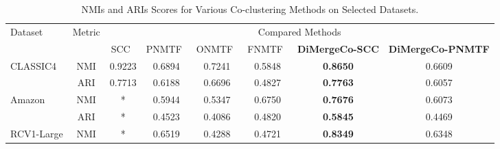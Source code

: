 \documentclass[journal]{IEEEtran}
\renewcommand{\cite}[1]{~\autocite{#1}}
\begin{document}
\begin{table}[htbp]
    \centering
    \caption{NMIs and ARIs Scores for Various Co-clustering Methods on Selected Datasets.}
    \label{tab:evaluation-metrics}
    \begin{tabular}{@{} l c cccccc @{}}
        \toprule
        \multirow{2}{*}{Dataset}    & \multirow{2}{*}{Metric} & \multicolumn{6}{c}{Compared Methods}                                                                                                                                                                                                             \\
        \cmidrule{3-8}
                                    &                         & SCC\cite{dhillon2001CoclusteringDocumentsWords} & PNMTF\cite{chen2023ParallelNonNegativeMatrix} & ONMTF\cite{ding2006OrthogonalNonnegativeMatrix} & FNMTF\cite{kim2011FastNonnegativeMatrix} & \textbf{DiMergeCo-SCC} & \textbf{DiMergeCo-PNMTF} \\
        \midrule
        \multirow{2}{*}{CLASSIC4}   & NMI                     & 0.9223                                          & 0.6894                                        & 0.7241                                          & 0.5848                                   & \textbf{0.8650}        & 0.6609                   \\
                                    & ARI                     & 0.7713                                          & 0.6188                                        & 0.6696                                          & 0.4827                                   & \textbf{0.7763}        & 0.6057                   \\
        \multirow{2}{*}{Amazon}     & NMI                     & *                                               & 0.5944                                        & 0.5347                                          & 0.6750                                   & \textbf{0.7676}        & 0.6073                   \\
                                    & ARI                     & *                                               & 0.4523                                        & 0.4086                                          & 0.4820                                   & \textbf{0.5845}        & 0.4469                   \\
        \multirow{2}{*}{RCV1-Large} & NMI                     & *                                               & 0.6519                                        & 0.4288                                          & 0.4721                                   & \textbf{0.8349}        & 0.6348                   \\

\end{tabular}
\end{table}
\end{document}
